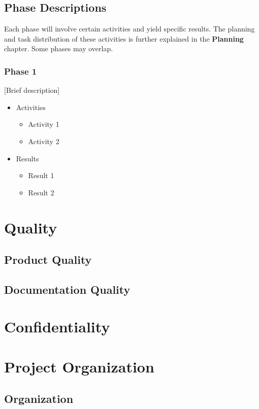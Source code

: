 \documentclass{article}
\begin{document}
\subsection{Phase Descriptions}
Each phase will involve certain activities and yield specific results. The planning and task distribution of these activities is further explained in the \textbf{Planning} chapter. Some phases may overlap.

\subsubsection{Phase 1}
[Brief description]
\begin{itemize}
    \item Activities
    \begin{itemize}
        \item Activity 1
        \item Activity 2
    \end{itemize}
    \item Results
    \begin{itemize}
        \item Result 1
        \item Result 2
    \end{itemize}
\end{itemize}


\newpage

\section{Quality}
\subsection{Product Quality}
\subsection{Documentation Quality}


\newpage

\section{Confidentiality}


\newpage

\section{Project Organization}
\subsection{Organization}
\end{document}
